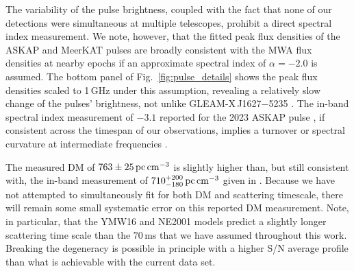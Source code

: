 \documentclass[fleqn,usenatbib]{mnras}
\newcommand{\Fig}{Fig.}
\begin{document}
The variability of the pulse brightness, coupled with the fact that none of our detections were simultaneous at multiple telescopes, prohibit a direct spectral index measurement.
We note, however, that the fitted peak flux densities of the ASKAP and MeerKAT pulses are broadly consistent with the MWA flux densities at nearby epochs if an approximate spectral index of $\alpha = -2.0$ is assumed.
The bottom panel of \Fig~\ref{fig:pulse_details} shows the peak flux densities scaled to 1\,GHz under this assumption, revealing a relatively slow change of the pulses' brightness, not unlike GLEAM-X\,J1627$-$5235 \citep{2022Natur.601..526H}.
The in-band spectral index measurement of $-3.1$ reported for the 2023 ASKAP pulse , if consistent across the timespan of our observations, implies a turnover or spectral curvature at intermediate frequencies \citep[perhaps comparable with GPM\,1839$-$10][]{2023Natur.619..487H}.

The measured DM of $763 \pm 25\,{\rm pc}\,{\rm cm}^{-3}$ is slightly higher than, but still consistent with, the in-band measurement of $710^{+200}_{-180}\,{\rm pc}\,{\rm cm}^{-3}$ given in .
Because we have not attempted to simultaneously fit for both DM and scattering timescale, there will remain some small systematic error on this reported DM measurement.
Note, in particular, that the YMW16 and NE2001 models predict a slightly longer scattering time scale than the $70\,$ms that we have assumed throughout this work.
Breaking the degeneracy is possible in principle with a higher S/N average profile than what is achievable with the current data set.
\end{document}
